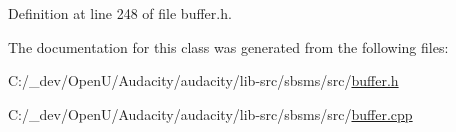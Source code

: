 Definition at line 248 of file buffer.\+h.



The documentation for this class was generated from the following files\+:\begin{DoxyCompactItemize}
\item 
C\+:/\+\_\+dev/\+Open\+U/\+Audacity/audacity/lib-\/src/sbsms/src/\hyperlink{sbsms_2src_2buffer_8h}{buffer.\+h}\item 
C\+:/\+\_\+dev/\+Open\+U/\+Audacity/audacity/lib-\/src/sbsms/src/\hyperlink{buffer_8cpp}{buffer.\+cpp}\end{DoxyCompactItemize}
